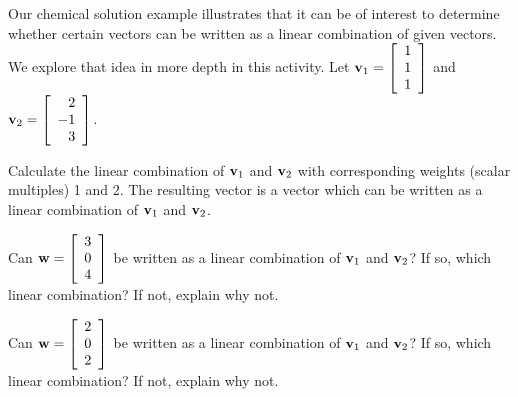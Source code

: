 \begin{activity} \label{act:A1.3_7} %
Our chemical solution example illustrates that it can be of interest to determine whether certain vectors can be written as a linear combination of given vectors. We explore that idea in more depth in this activity. Let $\mathbf{v}_1=\left[ \begin{array}{c} 1 \\ 1 \\ 1 \end{array} \right]$ and $\mathbf{v}_2=\left[ \begin{array}{r} 2 \\ -1 \\ 3 \end{array} \right]$.  

    \ba
    \item Calculate the linear combination of $\mathbf{v}_1$ and $\mathbf{v}_2$ with corresponding weights (scalar multiples) 1 and 2. The resulting vector is a vector which can be written as a linear combination of $\mathbf{v}_1$ and $\mathbf{v}_2$.

    
		
		\item Can $\mathbf{w} = \left[ \begin{array}{c} 3 \\ 0 \\ 4 \end{array} \right]$ be written as a linear combination of $\mathbf{v}_1$ and $\mathbf{v}_2$? If so, which linear combination? If not, explain why not.
		
		

    \item Can $\mathbf{w} = \left[ \begin{array}{c} 2 \\ 0 \\ 2 \end{array} \right]$ be written as a linear combination of $\mathbf{v}_1$ and $\mathbf{v}_2$? If so, which linear combination? If not, explain why not.
		
		


\end{activity}
